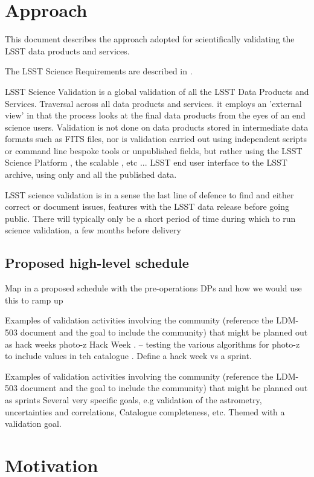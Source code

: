 \section{Approach} \label{sec:approach}

This document describes the approach adopted for scientifically validating the  LSST data products and services. 

The  LSST Science Requirements  are described in .


LSST Science Validation is a global validation of all the LSST Data Products and Services. Traversal across all data products and services.  it employs an 'external view' in that the process looks at the final data products from the eyes of an end science users. Validation is not done on data products stored in intermediate data formats such as FITS files, nor is validation carried out using independent scripts or command line bespoke tools or unpublished fields,  but rather using the LSST Science Platform , the scalable , etc ... LSST end user interface to the LSST archive, using only and all the published data. 

LSST science  validation is in a sense the last line of defence to find and either correct or document issues, features with the LSST data release before going public. There will typically only be a short period of time during which to run science validation, a few months before delivery 

\subsection{Proposed high-level schedule}

Map in a proposed schedule with the pre-operations DPs and how we would use this to ramp up 


Examples of validation activities involving the community (reference the LDM-503 document and the goal to include the community) that might be planned out as hack weeks
photo-z Hack Week .  -- testing the various algorithms for photo-z to include values in teh catalogue .
Define a hack week vs a sprint.


Examples of validation activities involving the community (reference the LDM-503 document and the goal to include the community) that might be planned out as sprints 
Several very specific goals, e.g validation of the astrometry, uncertainties and correlations, Catalogue completeness, etc. Themed with a validation goal. 

\section{Motivation}

